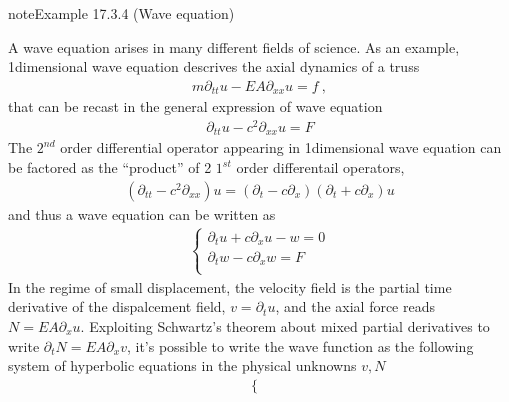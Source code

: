 \documentclass[letterpaper,10pt,english]{jupyterBook}
\begin{document}
\begin{sphinxadmonition}{note}{Example 17.3.4 (Wave equation)}



\sphinxAtStartPar
A wave equation arises in many different fields of science. As an example, 1\sphinxhyphen{}dimensional wave equation descrives the axial dynamics of a truss
\begin{equation*}
\begin{split}m \partial_{tt} u - EA \partial_{xx} u = f \ ,\end{split}
\end{equation*}
\sphinxAtStartPar
that can be recast in the general expression of wave equation
\begin{equation*}
\begin{split}\partial_{tt} u - c^2 \partial_{xx} u = F\end{split}
\end{equation*}
\sphinxAtStartPar
The \(2^{nd}\) order differential operator appearing in 1\sphinxhyphen{}dimensional wave equation can be factored as the “product” of 2 \(1^{st}\) order differentail operators,
\begin{equation*}
\begin{split}\left( \partial_{tt} - c^2 \partial_{xx} \right) u = \left( \partial_t - c \partial_x \right) \left( \partial_t + c \partial_x \right) u\end{split}
\end{equation*}
\sphinxAtStartPar
and thus a wave equation can be written as
\begin{equation*}
\begin{split}\begin{cases}
  \partial_t u + c \partial_x u - w = 0 \\
  \partial_t w - c \partial_x w     = F \\
\end{cases}\end{split}
\end{equation*}
\sphinxAtStartPar
In the regime of small displacement, the velocity field is the partial time derivative of the dispalcement field, \(v = \partial_t u\), and the axial force reads \(N = EA \partial_x u\). Exploiting Schwartz’s theorem about mixed partial derivatives to write \(\partial_t N = EA \partial_x v\), it’s possible to write the wave function as the following system of hyperbolic equations in the physical unknowns \(v, N\)
\begin{equation*}
\begin{split}\begin{cases}

\end{cases}
\end{split}
\end{equation*}
\end{sphinxadmonition}
\end{document}
